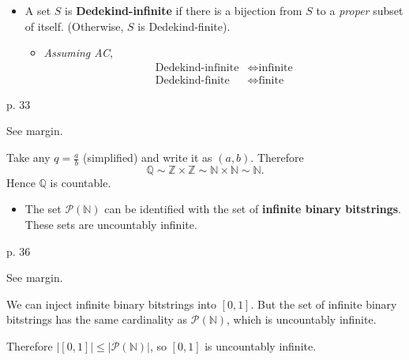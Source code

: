 \begin{itemize}
    \item A set $S$ is \textbf{Dedekind-infinite} if there is a bijection from $S$ to a \textit{proper} subset of itself. (Otherwise, $S$ is Dedekind-finite).
        \begin{itemize}
            \item \textit{Assuming AC},
                \begin{align*}
                    \text{Dedekind-infinite} &\iff \text{infinite} \\
                    \text{Dedekind-finite} &\iff \text{finite}
                \end{align*} 
        \end{itemize}
\end{itemize}

\begin{problem}{p. 33}{}


    See margin.

    \tcblower

    Take any $q = \frac{a}{b}$ (simplified) and write it as $(a, b)$. Therefore
        $$ \mathbb{Q} \sim \mathbb{Z} \times \mathbb{Z}
            \sim \mathbb{N} \times \mathbb{N} \sim \mathbb{N} . $$
    Hence $\mathbb{Q}$ is countable.
    
\end{problem}

\begin{itemize}
    \item The set $\mathcal{P}(\mathbb{N})$ can be identified with the set of \textbf{infinite binary bitstrings}. These sets are uncountably infinite.
\end{itemize}

\begin{problem}{p. 36}{}
    

    See margin.

    \tcblower

    We can inject infinite binary bitstrings into $[0, 1]$. But the set of infinite binary bitstrings has the same cardinality as $\mathcal{P}(\mathbb{N})$, which is uncountably infinite.
    
    Therefore $\lvert [0, 1] \rvert \leq \lvert \mathcal{P}(\mathbb{N}) \rvert$, so $[0, 1]$ is uncountably infinite.

\end{problem}

